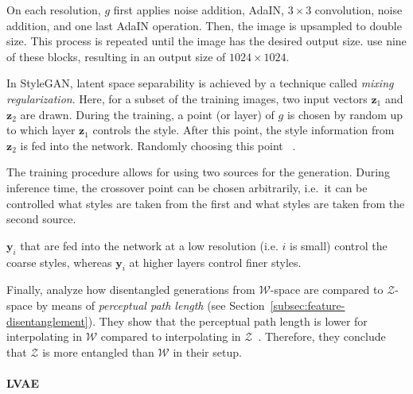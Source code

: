 On each resolution, $g$ first applies noise addition, \ac{AdaIN}, $3\times 3$ convolution, noise addition, and one last \ac{AdaIN} operation.
Then, the image is upsampled to double size.
This process is repeated until the image has the desired output size.
\citet{karras2019style} use nine of these blocks, resulting in an output size of $1024\times 1024$.

In StyleGAN, latent space separability is achieved by a technique called \textit{mixing regularization}.
Here, for a subset of the training images, two input vectors $\bm{z}_1$ and $\bm{z}_2$ are drawn.
During the training, a point (or layer) of $g$ is chosen by random up to which layer $\bm{z}_1$ controls the style.
After this point, the style information from $\bm{z}_2$ is fed into the network.
Randomly choosing this point ~\citep{karras2019style}.

The training procedure allows for using two sources for the generation.
During inference time, the crossover point can be chosen arbitrarily, i.e.~it can be controlled what styles are taken from the first and what styles are taken from the second source.

$\bm{y}_i$ that are fed into the network at a low resolution (i.e. $i$ is small) control the coarse styles, whereas $\bm{y}_i$ at higher layers control finer styles.

Finally, \citet{karras2019style} analyze how disentangled generations from $\mathcal{W}$-space are compared to $\mathcal{Z}$-space by means of \textit{perceptual path length} (see Section~\ref{subsec:feature-disentanglement}).
They show that the perceptual path length is lower for interpolating in $\mathcal{W}$ compared to interpolating in $\mathcal{Z}$~\citep{karras2019style}.
Therefore, they conclude that $\mathcal{Z}$ is more entangled than $\mathcal{W}$ in their setup.


\paragraph{\acl{LVAE}}

